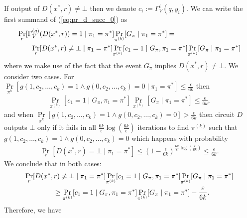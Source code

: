 %
If output of $D(x^*,r) \neq \bot$ then we denote $c_i := \Gamma_V^{i}(q, y_i)$.
We can write the first summand of (\ref{eq:pr_d_succ_0}) as
\begin{align}
  &\underset{r}{\Pr}[\Gamma_V^{(g)}(D(x^*,r)) = 1 \mid \pi_1 = \pi^*] \underset{\pi^{(k)}}{\Pr}[G_{\pi} \mid \pi_1 = \pi^*] = \notag\\
  &\mbox\qquad \underset{r}{\Pr}[D(x^*,r) \neq \bot \mid \pi_1 = \pi^*]
  \underset{\pi^{(k)}}{\Pr}[c_1 = 1 \mid G_{\pi}, \pi_1 = \pi^*]
  \underset{\pi^{(k)}}{\Pr}[G_{\pi} \mid \pi_1 = \pi^*]
\end{align}
where we make use of the fact that the event $G_{\pi}$ implies $D(x^*, r) \neq \bot$.
We consider two cases.
For $\underset{\pi^{k}}{\Pr}[g(1, c_2, \dots, c_k) = 1 \land g(0, c_2, \dots,c_k ) = 0 \mid \pi_1 = \pi^*] \leq \frac{\epsilon}{6k}$ then
\begin{align}
  \underset{\pi^{(k)}}{\Pr}[c_1 = 1 \mid G_{\pi}, \pi_1 = \pi^*] \underset{\pi^{(k)}}{\Pr}[G_{\pi} \mid \pi_1 = \pi^*] \leq \frac{\epsilon}{6k},
\end{align}
and when $\underset{\pi^{k}}{\Pr}[g(1, c_2, \dots, c_k) = 1 \land g(0, c_2, \dots,c_k ) = 0] > \frac{\epsilon}{6k}$ then circuit $D$ outputs $\bot$
only if it fails in all $\frac{6k}{\epsilon} \log(\frac{6k}{\epsilon})$ iterations to find $\pi^{(k)}$ such that $g(1, c_2, \dots, c_k) = 1 \land g(0, c_2, \dots, c_k) = 0$
which happens with probability
\begin{align}
\underset{r}{\Pr}[D(x^*,r) = \bot \mid \pi_1 = \pi^*] \leq (1 - \frac{\epsilon}{6k})^{\frac{6k}{\epsilon}\log(\frac{\epsilon}{6k})} \leq \frac{\epsilon}{6k}.
\end{align}
We conclude that in both cases:
\begin{align}
  &\underset{r}{\Pr}[D(x^*,r) \neq \bot \mid \pi_1 = \pi^*]
  \underset{\pi^{(k)}}{\Pr}[c_1 = 1 \mid G_{\pi}, \pi_1 = \pi^*]
  \underset{\pi^{(k)}}{\Pr}[G_{\pi} \mid \pi_1 = \pi^*] \notag\\
  &\mbox\qquad\qquad \geq \underset{\pi^{(k)}}{\Pr}[c_1 = 1 \mid G_{\pi}, \pi_1 = \pi^*]\underset{\pi^{(k)}}{\Pr}[G_{\pi} \mid \pi_1 = \pi^*] - \frac{\varepsilon}{6k}.
\end{align}
Therefore, we have
